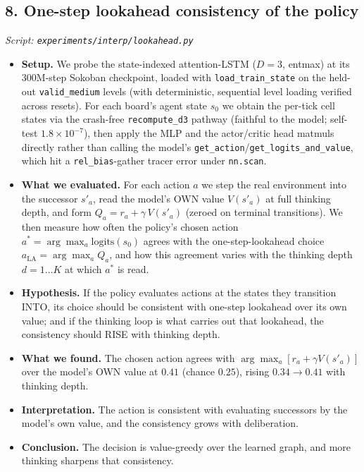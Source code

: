 \documentclass[11pt]{article}
\begin{document}
\subsection*{8. One-step lookahead consistency of the policy}
\textit{Script: \texttt{experiments/interp/lookahead.py}}
\begin{itemize}
\item \textbf{Setup.} We probe the state-indexed attention-LSTM ($D=3$, entmax) at its $300\mathrm{M}$-step Sokoban checkpoint, loaded with \texttt{load\_train\_state} on the held-out \texttt{valid\_medium} levels (with deterministic, sequential level loading verified across resets). For each board's agent state $s_0$ we obtain the per-tick cell states via the crash-free \texttt{recompute\_d3} pathway (faithful to the model; self-test $1.8\times10^{-7}$), then apply the MLP and the actor/critic head matmuls directly rather than calling the model's \texttt{get\_action}/\texttt{get\_logits\_and\_value}, which hit a \texttt{rel\_bias}-gather tracer error under \texttt{nn.scan}.
\item \textbf{What we evaluated.} For each action $a$ we step the real environment into the successor $s'_a$, read the model's OWN value $V(s'_a)$ at full thinking depth, and form $Q_a = r_a + \gamma\,V(s'_a)$ (zeroed on terminal transitions). We then measure how often the policy's chosen action $a^* = \arg\max_a \mathrm{logits}(s_0)$ agrees with the one-step-lookahead choice $a_{\mathrm{LA}} = \arg\max_a Q_a$, and how this agreement varies with the thinking depth $d=1\ldots K$ at which $a^*$ is read.
\item \textbf{Hypothesis.} If the policy evaluates actions at the states they transition INTO, its choice should be consistent with one-step lookahead over its own value; and if the thinking loop is what carries out that lookahead, the consistency should RISE with thinking depth.
\item \textbf{What we found.} The chosen action agrees with $\arg\max_a[r_a+\gamma V(s'_a)]$ over the model's OWN value at $0.41$ (chance $0.25$), rising $0.34\to0.41$ with thinking depth.
\item \textbf{Interpretation.} The action is consistent with evaluating successors by the model's own value, and the consistency grows with deliberation.
\item \textbf{Conclusion.} The decision is value-greedy over the learned graph, and more thinking sharpens that consistency.
\end{itemize}
\clearpage
\end{document}
